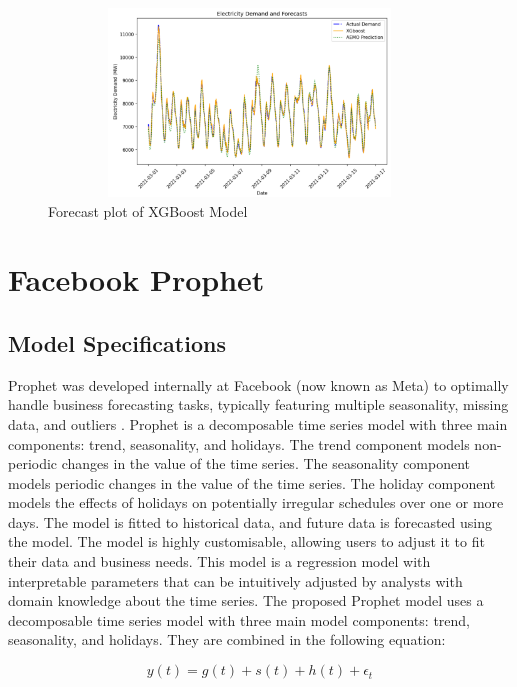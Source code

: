 \documentclass[mstat,12pt]{unswthesis}
\begin{document}
\begin{figure}[H]
\centering
\includegraphics[width=0.95\textwidth, height=5cm]{forecastplot.png}
\caption{Forecast plot of XGBoost Model}\label{forecastplot}
\end{figure}

\hypertarget{facebook-prophet}{%
\section{Facebook Prophet}\label{facebook-prophet}}

\hypertarget{model-specifications}{%
\subsection{Model Specifications}\label{model-specifications}}

Prophet was developed internally at Facebook (now known as Meta) to
optimally handle business forecasting tasks, typically featuring
multiple seasonality, missing data, and outliers
\cite{taylor2017facebook}. Prophet is a decomposable time series model
with three main components: trend, seasonality, and holidays. The trend
component models non-periodic changes in the value of the time series.
The seasonality component models periodic changes in the value of the
time series. The holiday component models the effects of holidays on
potentially irregular schedules over one or more days. The model is
fitted to historical data, and future data is forecasted using the
model. The model is highly customisable, allowing users to adjust it to
fit their data and business needs. This model is a regression model with
interpretable parameters that can be intuitively adjusted by analysts
with domain knowledge about the time series. The proposed Prophet model
uses a decomposable time series model with three main model components:
trend, seasonality, and holidays. They are combined in the following
equation:

\[
y(t) = g(t) + s(t) + h(t) + \epsilon_t
\]
\end{document}
